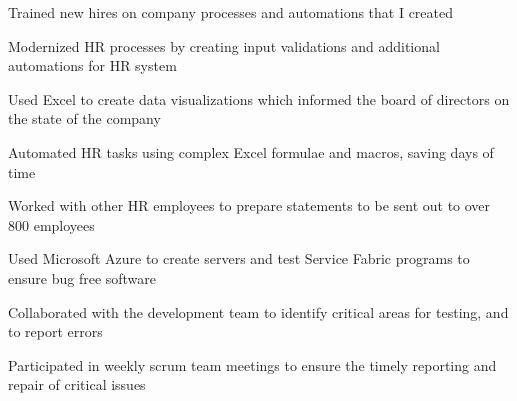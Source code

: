 \documentclass[]{deedy-resume-openfont}
\begin{document}
\begin{minipage}[t]{0.95\textwidth}
\begin{tightemize}
\item Trained new hires on company processes and automations that I created
\item Modernized HR processes by creating input validations and additional automations for HR system
\end{tightemize}

\begin{tightemize}
\item Used Excel to create data visualizations which informed the board of directors on the state of the company
\item Automated HR tasks using complex Excel formulae and macros, saving days of time
\item Worked with other HR employees to prepare statements to be sent out to over 800 employees
\end{tightemize}


\begin{tightemize}
\item Used Microsoft Azure to create servers and test Service Fabric programs to ensure bug free software
\item Collaborated with the development team to identify critical areas for testing, and to report errors
\item Participated in weekly scrum team meetings to ensure the timely reporting and repair of critical issues
\end{tightemize}





\end{minipage}
\end{document}
